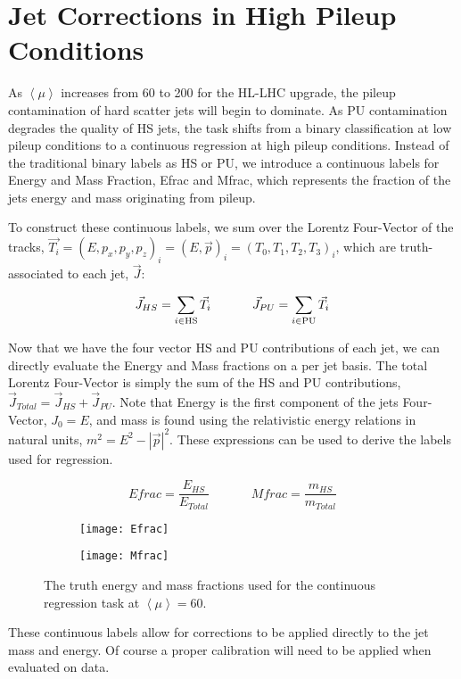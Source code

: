 \section{Jet Corrections in High Pileup Conditions}\hfill

As $\left<\mu\right>$ increases from 60 to 200 for the HL-LHC upgrade, the pileup contamination of hard scatter jets will begin to dominate. As PU contamination degrades the quality of HS jets, the task shifts from a binary classification at low pileup conditions to a continuous regression at high pileup conditions. Instead of the traditional binary labels as HS or PU, we introduce a continuous labels for Energy and Mass Fraction, Efrac and Mfrac, which represents the fraction of the jets energy and mass originating from pileup.

To construct these continuous labels, we sum over the Lorentz Four-Vector of the tracks, $\vec{T_i} = (E,p_x,p_y,p_z)_i = (E,\vec{p})_i = (T_0, T_1, T_2, T_3)_i$, which are truth-associated to each jet, $\vec{J}$:

\begin{equation}
    \vec{J}_{HS} = \sum_{i \in \text{HS}} \vec{T}_i \phantom{............} \vec{J}_{PU} = \sum_{i \in \text{PU}} \vec{T}_i \\
\end{equation}

Now that we have the four vector HS and PU contributions of each jet, we can directly evaluate the Energy and Mass fractions on a per jet basis. The total Lorentz Four-Vector is simply the sum of the HS and PU contributions, $\vec{J}_{Total} = \vec{J}_{HS} + \vec{J}_{PU}$. Note that Energy is the first component of the jets Four-Vector, $J_0=E$, and mass is found using the relativistic energy relations in natural units, $m^2=E^2-|\vec{p}|^2$. These expressions can be used to derive the labels used for regression.

\begin{equation}   
    Efrac = \frac{E_{HS}}{E_{Total}} \phantom{............} Mfrac = \frac{m_{HS}}{m_{Total}}
\end{equation}

\begin{figure}[h]
\centering
\begin{subfigure}{.35\textwidth}
  \centering
  \texttt{[image: Efrac]}
  \caption{}
  \label{fig:sub1}
\end{subfigure}%
\begin{subfigure}{.35\textwidth}
  \centering
  \texttt{[image: Mfrac]}
  \caption{}
  \label{fig:sub2}
\end{subfigure}
\caption{The truth energy and mass fractions used for the continuous regression task at $\left< \mu \right> = 60$.}
\label{fig:test}
\end{figure}

These continuous labels allow for corrections to be applied directly to the jet mass and energy. Of course a proper calibration will need to be applied when evaluated on data.

